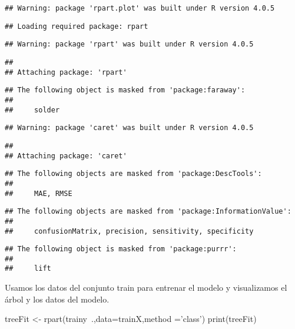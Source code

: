 \documentclass[
]{article}
\newenvironment{Shaded}{\begin{snugshade}}{\end{snugshade}}
\newcommand{\DataTypeTok}[1]{\textcolor[rgb]{0.87,0.87,0.75}{#1}}
\newcommand{\KeywordTok}[1]{\textcolor[rgb]{0.94,0.87,0.69}{#1}}
\newcommand{\NormalTok}[1]{\textcolor[rgb]{0.80,0.80,0.80}{#1}}
\newcommand{\OperatorTok}[1]{\textcolor[rgb]{0.94,0.94,0.82}{#1}}
\newcommand{\StringTok}[1]{\textcolor[rgb]{0.80,0.58,0.58}{#1}}
\begin{document}
\begin{verbatim}
## Warning: package 'rpart.plot' was built under R version 4.0.5
\end{verbatim}

\begin{verbatim}
## Loading required package: rpart
\end{verbatim}

\begin{verbatim}
## Warning: package 'rpart' was built under R version 4.0.5
\end{verbatim}

\begin{verbatim}
## 
## Attaching package: 'rpart'
\end{verbatim}

\begin{verbatim}
## The following object is masked from 'package:faraway':
## 
##     solder
\end{verbatim}

\begin{verbatim}
## Warning: package 'caret' was built under R version 4.0.5
\end{verbatim}

\begin{verbatim}
## 
## Attaching package: 'caret'
\end{verbatim}

\begin{verbatim}
## The following objects are masked from 'package:DescTools':
## 
##     MAE, RMSE
\end{verbatim}

\begin{verbatim}
## The following objects are masked from 'package:InformationValue':
## 
##     confusionMatrix, precision, sensitivity, specificity
\end{verbatim}

\begin{verbatim}
## The following object is masked from 'package:purrr':
## 
##     lift
\end{verbatim}

Usamos los datos del conjunto train para entrenar el modelo y
visualizamos el árbol y los datos del modelo.

\begin{Shaded}
\begin{Highlighting}[]
\NormalTok{treeFit <-}\StringTok{ }\KeywordTok{rpart}\NormalTok{(trainy}\OperatorTok{~}\NormalTok{.,}\DataTypeTok{data=}\NormalTok{trainX,}\DataTypeTok{method =}\StringTok{'class'}\NormalTok{)}
\KeywordTok{print}\NormalTok{(treeFit)}
\end{Highlighting}
\end{Shaded}
\end{document}
